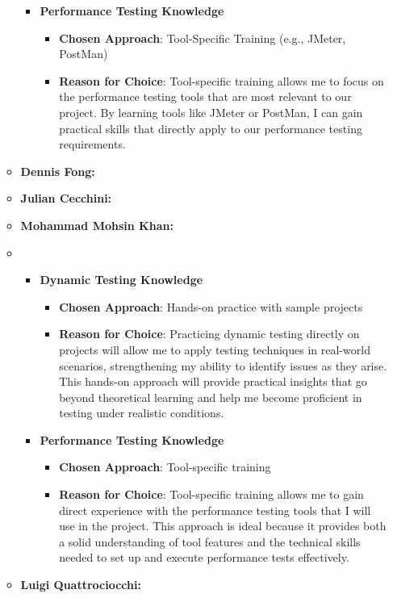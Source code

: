 \documentclass[12pt, titlepage]{article}
\begin{document}
\begin{enumerate}
\begin{itemize}
\begin{itemize}
        \item \textbf{Performance Testing Knowledge}  
        \begin{itemize}
            \item \textbf{Chosen Approach}: Tool-Specific Training (e.g., JMeter, PostMan)
            \item \textbf{Reason for Choice}: Tool-specific training allows me to focus on the performance testing 
            tools that are most relevant to our project. By learning tools like JMeter or PostMan, I can gain practical 
            skills that directly apply to our performance testing requirements.
        \end{itemize}
    \end{itemize}
    \item \textbf{Dennis Fong:}
    \item \textbf{Julian Cecchini:} 
    \item \textbf{Mohammad Mohsin Khan:}
    \item \begin{itemize}
      \item \textbf{Dynamic Testing Knowledge}  
      \begin{itemize}
          \item \textbf{Chosen Approach}: Hands-on practice with sample projects
          \item \textbf{Reason for Choice}: Practicing dynamic testing directly on projects will allow me to apply testing techniques in real-world scenarios, strengthening my ability to identify issues as they arise. This hands-on approach will provide practical insights that go beyond theoretical learning and help me become proficient in testing under realistic conditions.
      \end{itemize}
  
      \item \textbf{Performance Testing Knowledge}  
      \begin{itemize}
          \item \textbf{Chosen Approach}: Tool-specific training
          \item \textbf{Reason for Choice}: Tool-specific training allows me to gain direct experience with the performance testing tools that I will use in the project. This approach is ideal because it provides both a solid understanding of tool features and the technical skills needed to set up and execute performance tests effectively.
      \end{itemize}
  
  \end{itemize}
    \item \textbf{Luigi Quattrociocchi:}
\end{itemize}
\end{enumerate}
\end{document}
